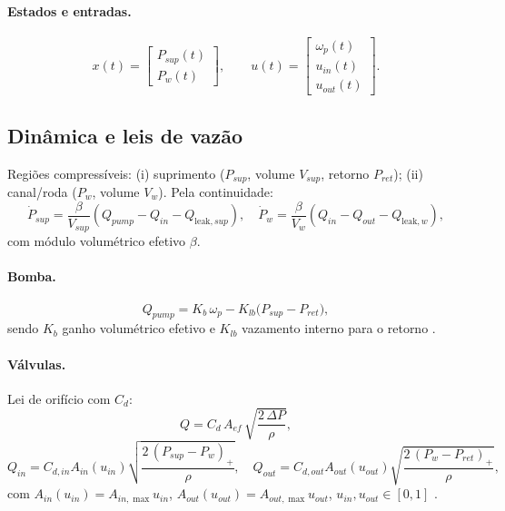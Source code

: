 \paragraph{Estados e entradas.}
\begin{equation}
    x(t)=\begin{bmatrix} P_{sup}(t)\\[2pt] P_{w}(t)\end{bmatrix},\qquad
    u(t)=\begin{bmatrix}\omega_p(t)\\[2pt]u_{in}(t)\\[2pt]u_{out}(t)\end{bmatrix}.
    \label{eq:vect-estados-hidraulico}
\end{equation}

\subsection{Dinâmica e leis de vazão}
\label{sec:dinamica-2p}

Regiões compressíveis: (i) suprimento ($P_{sup}$, volume $V_{sup}$, retorno $P_{ret}$); (ii) canal/roda ($P_w$, volume $V_w$). Pela continuidade:
\begin{equation}
    \dot{P}_{sup} = \frac{\beta}{V_{sup}}\!\left(Q_{pump} - Q_{in} - Q_{\text{leak},sup}\right),\quad
    \dot{P}_{w}   = \frac{\beta}{V_{w}}\!\left(Q_{in} - Q_{out} - Q_{\text{leak},w}\right),
    \label{eq:din_press}
\end{equation}
com módulo volumétrico efetivo $\beta$.

\paragraph{Bomba.}
\begin{equation}
    Q_{pump} = K_b\,\omega_p - K_{lb}\big(P_{sup}-P_{ret}\big),
    \label{eq:qpump_2p}
\end{equation}
sendo $K_b$ ganho volumétrico efetivo e $K_{lb}$ vazamento interno para o retorno \cite{MotorParametricDesign2023,WangBingbing2015}.

\paragraph{Válvulas.}
Lei de orifício com $C_d$:
\begin{equation}
    Q = C_d\,A_{ef}\,\sqrt{\frac{2\,\Delta P}{\rho}},
    \label{eq:lei-orificio}
\end{equation}
\begin{equation}
    Q_{in}=C_{d,in}A_{in}(u_{in})\sqrt{\frac{2\,(P_{sup}-P_w)_{+}}{\rho}},\quad
    Q_{out}=C_{d,out}A_{out}(u_{out})\sqrt{\frac{2\,(P_w-P_{ret})_{+}}{\rho}},
    \label{eq:qin_qout}
\end{equation}
com $A_{in}(u_{in})=A_{in,\max}u_{in}$, $A_{out}(u_{out})=A_{out,\max}u_{out}$, $u_{in},u_{out}\in[0,1]$ \cite{ProportionalPressureABS2023,Lv2014,ChenLv2017}.

